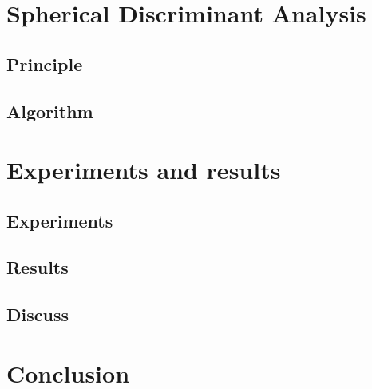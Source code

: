 \documentclass{techrep} %
\begin{document}
\chapter{Spherical Discriminant Analysis}
\section{Principle}
\section{Algorithm}

\chapter{Experiments and results}
\section{Experiments}
\section{Results}
\section{Discuss}
\chapter*{Conclusion}

 \nocite{*}
\end{document}
